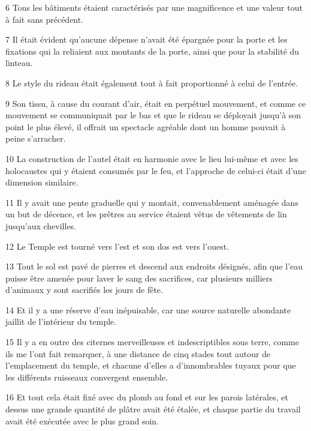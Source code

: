 \par 6 Tous les bâtiments étaient caractérisés par une magnificence et une valeur tout à fait sans précédent.

\par 7 Il était évident qu'aucune dépense n'avait été épargnée pour la porte et les fixations qui la reliaient aux montants de la porte, ainsi que pour la stabilité du linteau.

\par 8 Le style du rideau était également tout à fait proportionné à celui de l'entrée.

\par 9 Son tissu, à cause du courant d'air, était en perpétuel mouvement, et comme ce mouvement se communiquait par le bas et que le rideau se déployait jusqu'à son point le plus élevé, il offrait un spectacle agréable dont un homme pouvait à peine s'arracher.

\par 10 La construction de l'autel était en harmonie avec le lieu lui-même et avec les holocaustes qui y étaient consumés par le feu, et l'approche de celui-ci était d'une dimension similaire.

\par 11 Il y avait une pente graduelle qui y montait, convenablement aménagée dans un but de décence, et les prêtres au service étaient vêtus de vêtements de lin jusqu'aux chevilles.

\par 12 Le Temple est tourné vers l'est et son dos est vers l'ouest.

\par 13 Tout le sol est pavé de pierres et descend aux endroits désignés, afin que l'eau puisse être amenée pour laver le sang des sacrifices, car plusieurs milliers d'animaux y sont sacrifiés les jours de fête.

\par 14 Et il y a une réserve d'eau inépuisable, car une source naturelle abondante jaillit de l'intérieur du temple.

\par 15 Il y a en outre des citernes merveilleuses et indescriptibles sous terre, comme ils me l'ont fait remarquer, à une distance de cinq stades tout autour de l'emplacement du temple, et chacune d'elles a d'innombrables tuyaux pour que les différents ruisseaux convergent ensemble.

\par 16 Et tout cela était fixé avec du plomb au fond et sur les parois latérales, et dessus une grande quantité de plâtre avait été étalée, et chaque partie du travail avait été exécutée avec le plus grand soin.

